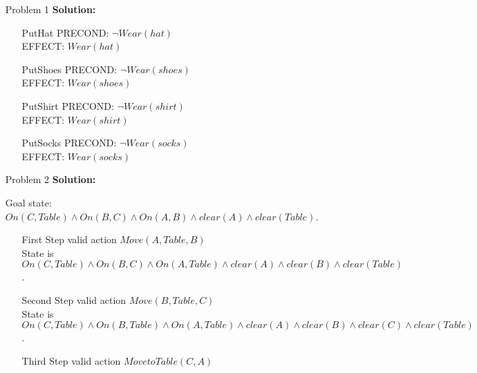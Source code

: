 \normalfont\documentclass[letterpaper,11pt]{article}
\begin{document}
\setlength{\parindent}{2ex}
\newcommand{\header}{
	\noindent {}
}
\bigskip
\header

\begin{enumerate}
\item[Problem 1]\textbf{Solution:}\par
\begin{enumerate}
	\item[PutHat]
		PRECOND: $\neg Wear(hat)$\\
		EFFECT: $Wear(hat)$
	\item[PutShoes]
		PRECOND: $\neg Wear(shoes)$\\
		EFFECT: $Wear(shoes)$
	\item[PutShirt]
		PRECOND: $\neg Wear(shirt)$\\
		EFFECT: $Wear(shirt)$
	\item[PutSocks]
		PRECOND: $\neg Wear(socks)$\\
		EFFECT: $Wear(socks)$
\end{enumerate}
\item[Problem 2]\textbf{Solution:}\par
	Goal state: 
	$On(C,Table) \land On(B,C) \land On(A,B) \land clear(A) \land clear(Table)$.\\
	\begin{enumerate}
		\item[First Step] valid action $Move(A,Table, B)$\\
			State is $On(C,Table) \land On(B,C) \land On(A,Table) \land clear(A) \land clear(B)\land clear(Table)$.\\
		\item[Second Step] valid action $Move(B,Table, C)$\\
			State is $On(C,Table) \land On(B,Table) \land On(A,Table) \land clear(A) \land clear(B)\land clear(C) \land clear(Table)$.\\
		\item[Third Step] valid action $MovetoTable(C,A)$\\

\end{enumerate}
\end{enumerate}
\end{document}
